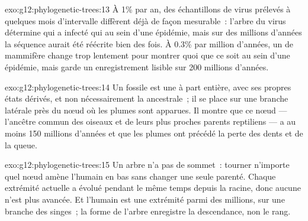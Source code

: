 \begin{solution}{exo:g12:phylogenetic-trees:13}
À 1\% par an, des échantillons de virus prélevés à quelques mois
d'intervalle diffèrent déjà de façon mesurable~: l'arbre du virus
détermine qui a infecté qui au sein d'une épidémie, mais sur des
millions d'années la séquence aurait été réécrite bien des fois. À
0.3\% par million d'années, un  de mammifère change trop lentement
pour montrer quoi que ce soit au sein d'une épidémie, mais garde un
enregistrement lisible sur 200 millions d'années.
\end{solution}

\begin{solution}{exo:g12:phylogenetic-trees:14}
Un fossile est une  à part entière, avec ses propres états
dérivés, et non nécessairement la  ancestrale~; il se place
sur une branche latérale près du nœud où les plumes sont apparues. Il
montre que ce nœud --- l'ancêtre commun des oiseaux et de leurs plus
proches parents reptiliens --- a au moins 150 millions d'années et que
les plumes ont précédé la perte des dents et de la queue.
\end{solution}

\begin{solution}{exo:g12:phylogenetic-trees:15}
Un arbre n'a pas de sommet~: tourner n'importe quel nœud amène
l'humain en bas sans changer une seule parenté. Chaque extrémité
actuelle a évolué pendant le même temps depuis la racine, donc aucune
n'est plus avancée. Et l'humain est une extrémité parmi des millions,
sur une branche des singes~; la forme de l'arbre enregistre la
descendance, non le rang.
\end{solution}

